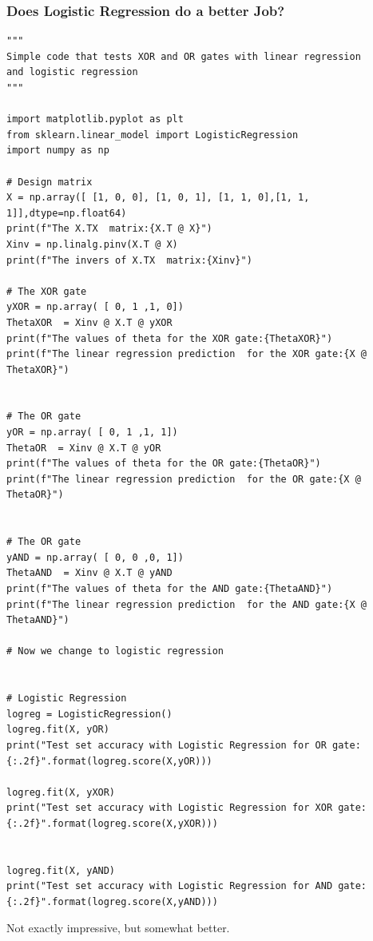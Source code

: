 \documentclass{beamer}
\begin{document}
\begin{frame}
\frametitle{Does Logistic Regression do a better Job?}

\begin{verbatim}
"""
Simple code that tests XOR and OR gates with linear regression
and logistic regression
"""

import matplotlib.pyplot as plt
from sklearn.linear_model import LogisticRegression
import numpy as np

# Design matrix
X = np.array([ [1, 0, 0], [1, 0, 1], [1, 1, 0],[1, 1, 1]],dtype=np.float64)
print(f"The X.TX  matrix:{X.T @ X}")
Xinv = np.linalg.pinv(X.T @ X)
print(f"The invers of X.TX  matrix:{Xinv}")

# The XOR gate 
yXOR = np.array( [ 0, 1 ,1, 0])
ThetaXOR  = Xinv @ X.T @ yXOR
print(f"The values of theta for the XOR gate:{ThetaXOR}")
print(f"The linear regression prediction  for the XOR gate:{X @ ThetaXOR}")


# The OR gate 
yOR = np.array( [ 0, 1 ,1, 1])
ThetaOR  = Xinv @ X.T @ yOR
print(f"The values of theta for the OR gate:{ThetaOR}")
print(f"The linear regression prediction  for the OR gate:{X @ ThetaOR}")


# The OR gate 
yAND = np.array( [ 0, 0 ,0, 1])
ThetaAND  = Xinv @ X.T @ yAND
print(f"The values of theta for the AND gate:{ThetaAND}")
print(f"The linear regression prediction  for the AND gate:{X @ ThetaAND}")

# Now we change to logistic regression


# Logistic Regression
logreg = LogisticRegression()
logreg.fit(X, yOR)
print("Test set accuracy with Logistic Regression for OR gate: {:.2f}".format(logreg.score(X,yOR)))

logreg.fit(X, yXOR)
print("Test set accuracy with Logistic Regression for XOR gate: {:.2f}".format(logreg.score(X,yXOR)))


logreg.fit(X, yAND)
print("Test set accuracy with Logistic Regression for AND gate: {:.2f}".format(logreg.score(X,yAND)))

\end{verbatim}


Not exactly impressive, but somewhat better.
\end{frame}
\end{document}
